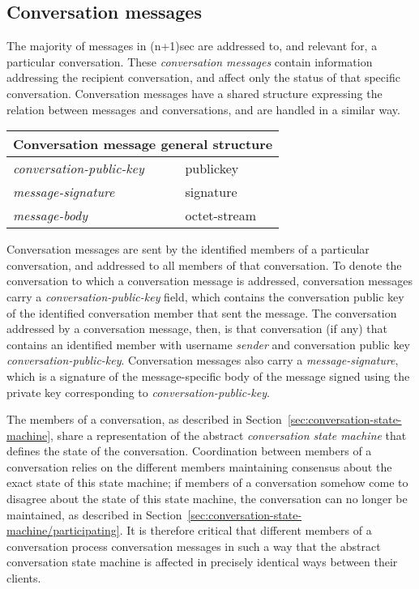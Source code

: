 \documentclass{article}
\def\field#1{\textit{#1}}
\def\type#1{\textsf{#1}}
\begin{document}
\subsection{Conversation messages}
\label{sec:messages/conversation-messages}

The majority of messages in (n+1)sec are addressed to, and relevant for, a particular conversation.
These \emph{conversation messages} contain information addressing the recipient conversation, and affect only the status of that specific conversation.
Conversation messages have a shared structure expressing the relation between messages and conversations, and are handled in a similar way.

\hspace{2em minus 2em}\begin{tabular}{|l|l|}
\hline
\multicolumn{2}{|c|}{Conversation message general structure} \\
\hline
\hline
\field{conversation-public-key} & \type{publickey} \\
\hline
\field{message-signature} & \type{signature} \\
\hline
\field{message-body} & \type{octet-stream} \\
\hline
\end{tabular}

Conversation messages are sent by the identified members of a particular conversation, and addressed to all members of that conversation.
To denote the conversation to which a conversation message is addressed, conversation messages carry a \field{conversation-public-key} field, which contains the conversation public key of the identified conversation member that sent the message.
The conversation addressed by a conversation message, then, is that conversation (if any) that contains an identified member with username \field{sender} and conversation public key \field{conversation-public-key}.
Conversation messages also carry a \field{message-signature}, which is a signature of the message-specific body of the message signed using the private key corresponding to \field{conversation-public-key}.

The members of a conversation, as described in Section~\ref{sec:conversation-state-machine}, share a representation of the abstract \emph{conversation state machine} that defines the state of the conversation.
Coordination between members of a conversation relies on the different members maintaining consensus about the exact state of this state machine; if members of a conversation somehow come to disagree about the state of this state machine, the conversation can no longer be maintained, as described in Section~\ref{sec:conversation-state-machine/participating}.
It is therefore critical that different members of a conversation process conversation messages in such a way that the abstract conversation state machine is affected in precisely identical ways between their clients.
\end{document}
